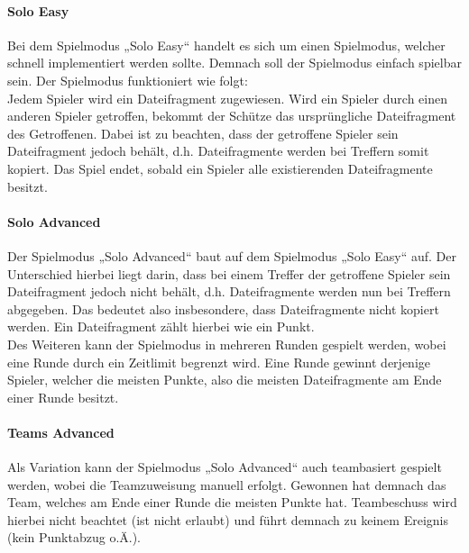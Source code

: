 \paragraph{Solo Easy}
Bei dem Spielmodus „Solo Easy“ handelt es sich um einen Spielmodus, welcher schnell implementiert werden sollte. Demnach soll der Spielmodus einfach spielbar sein. Der Spielmodus funktioniert wie folgt: \\
Jedem Spieler wird ein Dateifragment zugewiesen. Wird ein Spieler durch einen anderen Spieler getroffen, bekommt der Schütze das ursprüngliche Dateifragment des Getroffenen. Dabei ist zu beachten, dass der getroffene Spieler sein Dateifragment jedoch behält, d.h. Dateifragmente werden bei Treffern somit kopiert. Das Spiel endet, sobald ein Spieler alle existierenden Dateifragmente besitzt.

\paragraph{Solo Advanced}
Der Spielmodus „Solo Advanced“ baut auf dem Spielmodus „Solo Easy“ auf. Der Unterschied hierbei liegt darin, dass bei einem Treffer der getroffene Spieler sein Dateifragment jedoch nicht behält, d.h. Dateifragmente werden nun bei Treffern abgegeben. Das bedeutet also insbesondere, dass Dateifragmente nicht kopiert werden. Ein Dateifragment zählt hierbei wie ein Punkt. \\
Des Weiteren kann der Spielmodus in mehreren Runden gespielt werden, wobei eine Runde durch ein Zeitlimit begrenzt wird. Eine Runde gewinnt derjenige Spieler, welcher die meisten Punkte, also die meisten Dateifragmente am Ende einer Runde besitzt.

\paragraph{Teams Advanced}
Als Variation kann der Spielmodus „Solo Advanced“ auch teambasiert gespielt werden, wobei die Teamzuweisung manuell erfolgt. Gewonnen hat demnach das Team, welches am Ende einer Runde die meisten Punkte hat. Teambeschuss wird hierbei nicht beachtet (ist nicht erlaubt) und führt demnach zu keinem Ereignis (kein Punktabzug o.Ä.).

